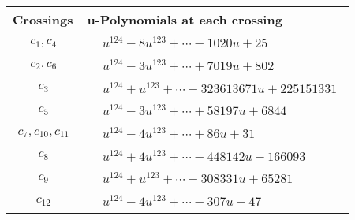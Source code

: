 \documentclass[1p]{elsarticle_modified}
\theoremstyle{definition}
\begin{document}
\begin{tabular}{m{50pt}|m{274pt}}
Crossings & \hspace{64pt}u-Polynomials at each crossing \\
\hline $$\begin{aligned}c_{1},c_{4}\end{aligned}$$&$\begin{aligned}
&u^{124}-8 u^{123}+\cdots-1020 u+25
\end{aligned}$\\
\hline $$\begin{aligned}c_{2},c_{6}\end{aligned}$$&$\begin{aligned}
&u^{124}-3 u^{123}+\cdots+7019 u+802
\end{aligned}$\\
\hline $$\begin{aligned}c_{3}\end{aligned}$$&$\begin{aligned}
&u^{124}+u^{123}+\cdots-323613671 u+225151331
\end{aligned}$\\
\hline $$\begin{aligned}c_{5}\end{aligned}$$&$\begin{aligned}
&u^{124}-3 u^{123}+\cdots+58197 u+6844
\end{aligned}$\\
\hline $$\begin{aligned}c_{7},c_{10},c_{11}\end{aligned}$$&$\begin{aligned}
&u^{124}-4 u^{123}+\cdots+86 u+31
\end{aligned}$\\
\hline $$\begin{aligned}c_{8}\end{aligned}$$&$\begin{aligned}
&u^{124}+4 u^{123}+\cdots-448142 u+166093
\end{aligned}$\\
\hline $$\begin{aligned}c_{9}\end{aligned}$$&$\begin{aligned}
&u^{124}+u^{123}+\cdots-308331 u+65281
\end{aligned}$\\
\hline $$\begin{aligned}c_{12}\end{aligned}$$&$\begin{aligned}
&u^{124}-4 u^{123}+\cdots-307 u+47
\end{aligned}$\\
\hline
\end{tabular}\\~\\
\end{document}
